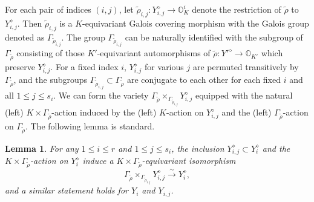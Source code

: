 \documentclass[11pt, a4paper]{amsart}
\newcommand{\orb}{\mathbb{O}}
\newtheorem{Lem}[Thm]{Lemma}
\theoremstyle{definition}
\numberwithin{equation}{section}
\begin{document}
For each pair of indices $(i, j)$, let $\tilde{\rho}_{i,j}: Y_{i,j}^\diamond \to \orb_{K}^i$ denote the restriction of $\tilde{\rho}$ to $Y_{i,j}^\diamond$. Then $\tilde{\rho}_{i,j}$ is a $K$-equivariant Galois covering morphism with the Galois group denoted as $\Gamma_{\tilde{\rho}_{i,j}}$. The group $\Gamma_{\tilde{\rho}_{i,j}}$ can be naturally identified with the subgroup of $\Gamma_{\tilde{\rho}}$ consisting of those $K'$-equivariant automorphisms of $\tilde{\rho}: Y'^\diamond \to \orb_{K'}$ which preserve $Y_{i,j}^\diamond$. For a fixed index $i$, $Y_{i,j}^\diamond$ for various $j$ are permuted transitively by $\Gamma_{\tilde{\rho}}$, and the subgroups $\Gamma_{\tilde{\rho}_{i,j}} \subset \Gamma_{\tilde{\rho}}$ are conjugate to each other for each fixed $i$ and all $1 \leqslant j \leqslant s_i$. We can form the variety $\Gamma_{\tilde{\rho}} \times_{\Gamma_{\tilde{\rho}_{i,j}}} Y_{i,j}^\diamond$ equipped with the natural (left) $K \times \Gamma_{\tilde{\rho}}$-action induced by the (left) $K$-action on $Y_{i,j}^\diamond$ and the (left) $\Gamma_{\tilde{\rho}}$-action on $\Gamma_{\tilde{\rho}}$. The following lemma is standard.

\begin{Lem} \label{lem:ind_Y}
	For any $1 \leqslant i \leqslant r$ and $1 \leqslant j \leqslant s_i$, the inclusion $Y_{i,j}^\diamond \subset Y_i^\diamond$ and the $K \times \Gamma_{\tilde{\rho}}$-action on $Y_i^\diamond$ induce a $K \times \Gamma_{\tilde{\rho}}$-equivariant isomorphism
	\[ 
		\Gamma_{\tilde{\rho}} \times_{\Gamma_{\tilde{\rho}_{i,j}}} Y_{i,j}^\diamond \xrightarrow{\sim} Y_i^\diamond,
	\]
	and a similar statement holds for $Y_i$ and $Y_{i,j}$.
\end{Lem}
\end{document}
